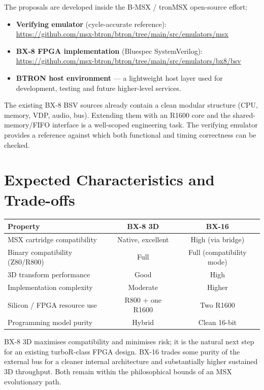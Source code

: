 \documentclass[11pt,a4paper]{article}
\begin{document}
The proposals are developed inside the B-MSX / tronMSX open-source effort:

\begin{itemize}
    \item \textbf{Verifying emulator} (cycle-accurate reference):\\
    \url{https://github.com/msx-btron/btron/tree/main/src/emulators/msx}
    \item \textbf{BX-8 FPGA implementation} (Bluespec SystemVerilog):\\
    \url{https://github.com/msx-btron/btron/tree/main/src/emulators/bx8/bsv}
    \item \textbf{BTRON host environment} --- a lightweight host layer used for development, testing and future higher-level services.
\end{itemize}

The existing BX-8 BSV sources already contain a clean modular structure (CPU, memory, VDP, audio, bus). Extending them with an R1600 core and the shared-memory/FIFO interface is a well-scoped engineering task. The verifying emulator provides a reference against which both functional and timing correctness can be checked.

\section{Expected Characteristics and Trade-offs}

\begin{center}
\begin{tabular}{@{}lcc@{}}
\toprule
Property & BX-8 3D & BX-16 \\
\midrule
MSX cartridge compatibility & Native, excellent & High (via bridge) \\
Binary compatibility (Z80/R800) & Full & Full (compatibility mode) \\
3D transform performance & Good & High \\
Implementation complexity & Moderate & Higher \\
Silicon / FPGA resource use & R800 + one R1600 & Two R1600 \\
Programming model purity & Hybrid & Clean 16-bit \\
\bottomrule
\end{tabular}
\end{center}

BX-8 3D maximises compatibility and minimises risk; it is the natural next step for an existing turboR-class FPGA design. BX-16 trades some purity of the external bus for a cleaner internal architecture and substantially higher sustained 3D throughput. Both remain within the philosophical bounds of an MSX evolutionary path.
\end{document}
